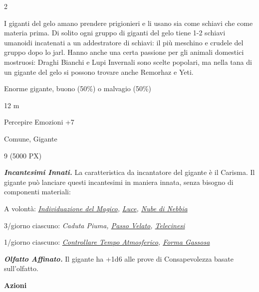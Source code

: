 \begin{multicols}{2}
{I giganti del gelo amano prendere prigionieri e li usano sia come schiavi che come materia prima. Di solito ogni gruppo di giganti del gelo tiene 1-2 schiavi umanoidi incatenati a un addestratore di schiavi: il più meschino e crudele del gruppo dopo lo jarl. Hanno anche una certa passione per gli animali domestici mostruosi: Draghi Bianchi e Lupi Invernali sono scelte popolari, ma nella tana di un gigante del gelo si possono trovare anche Remorhaz e Yeti.

\begin{description}[noitemsep, topsep=0pt, parsep=0pt, partopsep=0pt, itemsep=1pt, leftmargin=2.35cm,  labelwidth=2.2cm, itemindent=0cm, listparindent=0pt] %
\setlength{\baselineskip}{10pt}
\item[\textbf{Taglia/Tipo}] Enorme gigante, buono (50\%) o malvagio (50\%)
\item[\textbf{Caratt.}] 
\item[\textbf{Punti Ferita}] 
\item[\textbf{Movimento}] 12 m
\item[\textbf{Tiri Salvez.}] 
\item[\textbf{Comp.}] Percepire Emozioni +7
\item[\textbf{Linguaggi}] Comune, Gigante
\item[\textbf{Sfida}] 9 (5000 PX)
\end{description}
\smallskip

\emph{\textbf{Incantesimi Innati.}} La caratteristica da incantatore del gigante è il Carisma. Il gigante può lanciare questi incantesimi in maniera innata, senza bisogno di componenti materiali:

A volontà: \emph{\hyperlink{Individuazione del Magico}{Individuazione del Magico}, \hyperlink{Luce}{Luce}, \hyperlink{Nube di Nebbia}{Nube di Nebbia}}

3/giorno ciascuno: \emph{Caduta Piuma, \hyperlink{Passo Velato}{Passo Velato}, \hyperlink{Telecinesi}{Telecinesi}}

1/giorno ciascuno: \emph{\hyperlink{Controllare Tempo Atmosferico}{Controllare Tempo Atmosferico}, \hyperlink{Forma Gassosa}{Forma Gassosa}}

\emph{\textbf{Olfatto Affinato.}} Il gigante ha +1d6 alle prove di Consapevolezza basate sull'olfatto.

\textbf{Azioni}

}
\end{multicols}

